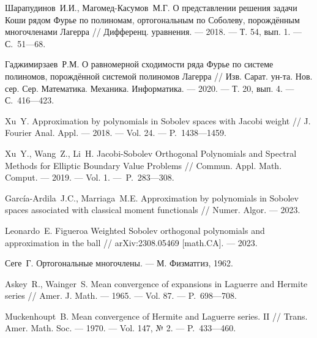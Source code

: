 \begin{thebibliography}{11}
{Шарапудинов~И.И., Магомед-Касумов~М.Г.} 
О представлении решения задачи Коши рядом Фурье по полиномам, ортогональным по Соболеву, порождённым многочленами Лагерра 
// 
Дифференц. уравнения. 
--- 2018. 
--- Т. 54, вып. 1. 
--- С.~51---68.





{Гаджимирзаев~Р.М.} 
О равномерной сходимости ряда Фурье по системе полиномов, порождённой системой полиномов Лагерра 
// 
Изв. Сарат. ун-та. Нов. сер. Сер. Математика. Механика. Информатика. 
--- 2020. 
--- Т. 20, вып. 4. 
--- С.~416---423.






{Xu~Y.} 
Approximation by polynomials in Sobolev spaces with Jacobi weight 
// 
J. Fourier Anal. Appl. 
--- 2018. 
--- Vol. 24. 
--- P.~1438---1459.



{Xu~Y., Wang~Z., Li~H.} 
Jacobi-Sobolev Orthogonal Polynomials and Spectral Methods for Elliptic Boundary Value Problems 
//
Commun. Appl. Math. Comput.
--- 2019.
--- Vol. 1.
---~P.~283---308.

\foreignlanguage{english}{%
{Garc\'ia-Ardila~J.C., Marriaga~M.E.}
Approximation by polynomials in Sobolev spaces associated with classical moment functionals 
//
Numer. Algor.
--- 2023.
}%


{Leonardo~E. Figueroa} 
Weighted Sobolev orthogonal polynomials and approximation in the ball 
// 
arXiv:2308.05469 [math.CA].
--- 2023.





			
{Сеге~Г.} 
Ортогональные многочлены. 
--- М. Физматгиз, 1962.





{Askey~R., Wainger~S.} 
Mean convergence of expansions in Laguerre and Hermite series 
// 
Amer. J. Math.
--- 1965.
--- Vol. 87.
--- P.~698---708.





{Muckenhoupt~B.} 
Mean convergence of Hermite and Laguerre series. II 
// 
Trans. Amer. Math. Soc. 
--- 1970.
--- Vol. 147, № 2.
--- P.~433---460.






\end{thebibliography}
